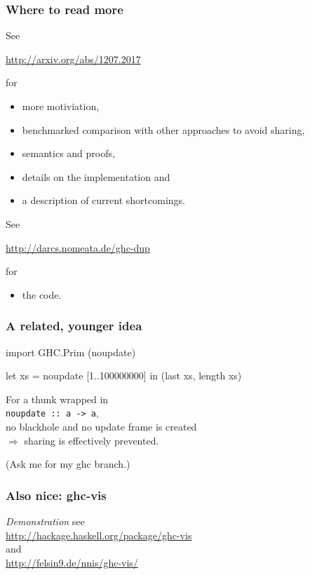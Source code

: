 \documentclass{beamer}
\begin{document}
\begin{frame}
\frametitle{Where to read more}
See\par {\centering\Large \url{http://arxiv.org/abs/1207.2017}\par} for
\begin{itemize}
\item more motiviation,
\item benchmarked comparison with other approaches to avoid sharing,
\item semantics and proofs,
\item details on the implementation and
\item a description of current shortcomings.
\end{itemize}
\vfill
See\par {\centering\Large \url{http://darcs.nomeata.de/ghc-dup}\par} for
\begin{itemize}
\item the code.
\end{itemize}

\end{frame}


\begin{frame}[fragile]
\frametitle{A related, younger idea}

\begin{haskell}
import GHC.Prim (noupdate)

let xs = noupdate [1..100000000]
in (last xs, length xs)
\end{haskell}
\vfill

\centering
For a thunk wrapped in\\[0.5em]
{\Large \lstinline!noupdate :: a -> a!},\\[0.5em]
no blackhole and no update frame is created\\[0.5em]
$\Longrightarrow$ sharing is effectively prevented.
\vfill

(Ask me for my ghc branch.)

\end{frame}


\begin{frame}[fragile]
\frametitle{Also nice: ghc-vis}

\centering
\textit{Demonstration}
\vfill
see\\
\url{http://hackage.haskell.org/package/ghc-vis}\\
and\\
\url{http://felsin9.de/nnis/ghc-vis/}
\vfill

\end{frame}
\end{document}
